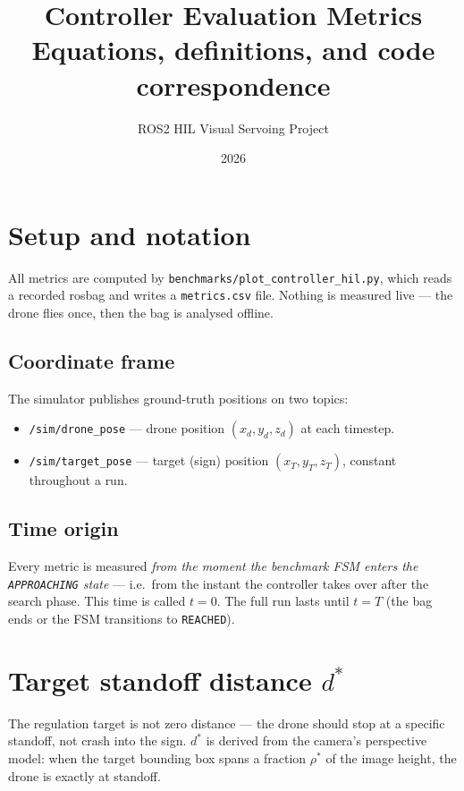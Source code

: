 \documentclass[11pt,a4paper]{article}
\title{\textbf{Controller Evaluation Metrics}\\[4pt]
  \large Equations, definitions, and code correspondence}
\author{ROS2 HIL Visual Servoing Project}
\date{2026}
\begin{document}
\maketitle
\tableofcontents
\bigskip

\section{Setup and notation}

All metrics are computed by \texttt{benchmarks/plot\_controller\_hil.py}, which
reads a recorded rosbag and writes a \texttt{metrics.csv} file.  Nothing is
measured live --- the drone flies once, then the bag is analysed offline.

\subsection*{Coordinate frame}

The simulator publishes ground-truth positions on two topics:
\begin{itemize}
  \item \texttt{/sim/drone\_pose} --- drone position $(x_d, y_d, z_d)$ at each timestep.
  \item \texttt{/sim/target\_pose} --- target (sign) position $(x_T, y_T, z_T)$,
        constant throughout a run.
\end{itemize}

\subsection*{Time origin}

Every metric is measured \emph{from the moment the benchmark FSM enters the
\texttt{APPROACHING} state} --- i.e.\ from the instant the controller takes
over after the search phase.  This time is called $t = 0$.  The full run
lasts until $t = T$ (the bag ends or the FSM transitions to \texttt{REACHED}).

\section{Target standoff distance \boldmath$d^*$}

The regulation target is not zero distance --- the drone should stop at a
specific standoff, not crash into the sign.  $d^*$ is derived from the
camera's perspective model: when the target bounding box spans a fraction
$\rho^*$ of the image height, the drone is exactly at standoff.
\end{document}
